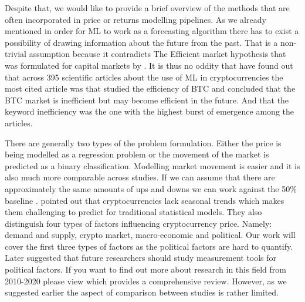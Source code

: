 Despite that, we would like to provide a brief overview
of the methods that are often incorporated in price or returns modelling pipelines.
As we already mentioned in order for \ac{ML} to work as a forecasting
algorithm there has to
exist a possibility of drawing information about the future from the past.
That is a non-trivial assumption because it contradicts The Efficient market 
hypothesis
that was formulated for capital markets by \cite{Fama1970}.
It is thus no oddity that \cite{Ren2022} have found out that across 395 scientific
articles about the use of \ac{ML} in cryptocurrencies the most cited 
article was \cite{Urquhart2016} that studied the efficiency of \ac{BTC} and 
concluded that the \ac{BTC} market is inefficient but may become efficient in the future.
And that the keyword
inefficiency was the one with the highest burst of emergence among the articles.


There are generally two types of the problem formulation. Either the price is 
being modelled as a regression problem or the movement of the market is predicted
as a binary classification. Modelling market movement
is easier and it is also much more comparable across studies. If we can assume 
that there are approximately the same amounts of ups and downs we can work
against the 50\% baseline \cite{Akyildirim2020}.
\cite{Khedr2021} pointed out that cryptocurrencies lack seasonal trends
which makes them challenging to predict for traditional statistical models. 
They also distinguish four types of factors influencing cryptocurrency price.
Namely: demand and supply, crypto market, macro-economic and political. 
Our work will cover the first three types of factors as the political factors
are hard to quantify. Later \cite{Ren2022} suggested that future researchers should
study measurement tools for political factors. 
If you want to find out more about research in this
field from 2010-2020 please view \cite{Khedr2021} which provides a comprehensive
review. However, as we suggested 
earlier the aspect of comparison between studies is rather limited.


